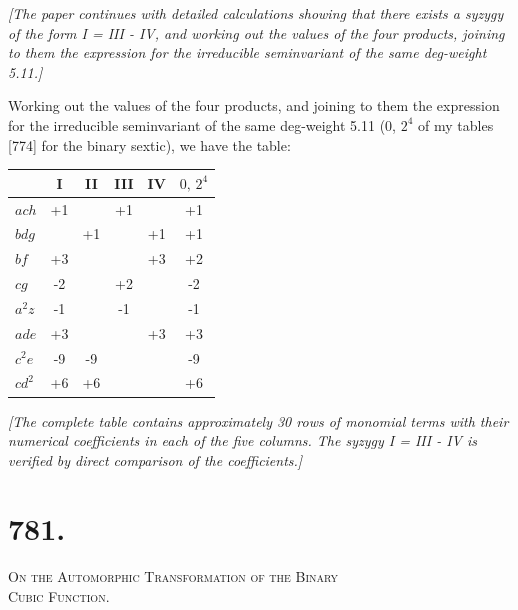 \documentclass[11pt,a4paper]{article}
\theoremstyle{cayley}
\begin{document}
\textit{[The paper continues with detailed calculations showing that there exists a syzygy of the form I = III - IV, and working out the values of the four products, joining to them the expression for the irreducible seminvariant of the same deg-weight 5.11.]}

Working out the values of the four products, and joining to them the expression for the irreducible seminvariant of the same deg-weight 5.11 (0, $2^{4}$ of my tables [774] for the binary sextic), we have the table:

\begin{center}
\begin{tabular}{|l|c|c|c|c|c|}
\hline
 & I & II & III & IV & $0,\, 2^{4}$ \\
\hline
$ach$ & +1 & & +1 & & +1 \\
$bdg$ & & +1 & & +1 & +1 \\
$bf$ & +3 & & & +3 & +2 \\
$cg$ & -2 & & +2 & & -2 \\
$a^{2}z$ & -1 & & -1 & & -1 \\
$ade$ & +3 & & & +3 & +3 \\
$c^{2}e$ & -9 & -9 & & & -9 \\
$cd^{2}$ & +6 & +6 & & & +6 \\
\hline
\end{tabular}
\end{center}

\textit{[The complete table contains approximately 30 rows of monomial terms with their numerical coefficients in each of the five columns. The syzygy I = III - IV is verified by direct comparison of the coefficients.]}

\newpage

\section*{781.}

\begin{center}
\Large\scshape On the Automorphic Transformation of the Binary\\Cubic Function.
\end{center}
\end{document}
